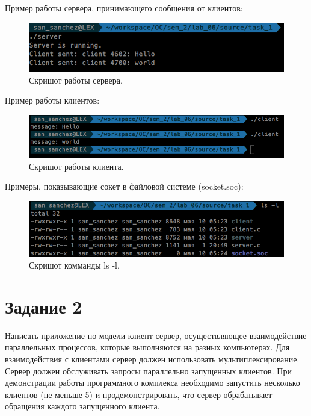 Пример работы сервера, принимающего сообщения от клиентов:
\begin{figure}[H]
    \centering
    \includegraphics[scale=0.6]{data/image/cor_2.png}
    \caption{Скришот работы сервера.}
\end{figure}
Пример работы клиентов:
\begin{figure}[H]
    \centering
    \includegraphics[scale=0.6]{data/image/cor_3.png}
    \caption{Скришот работы клиента.}
\end{figure}

Примеры, показывающие сокет в файловой системе (socket.soc):
\begin{figure}[H]
    \centering
    \includegraphics[scale=0.38]{data/image/cor_1.png}
    \caption{Скришот комманды ls -l.}
\end{figure}


\section{Задание \No{}2}

Написать приложение по модели клиент-сервер, осуществляющее взаимодействие параллельных процессов, которые выполняются на разных компьютерах. Для взаимодействия с клиентами сервер должен использовать мультиплексирование. Сервер должен обслуживать запросы параллельно запущенных клиентов. При демонстрации работы программного комплекса необходимо запустить несколько клиентов (не меньше 5) и продемонстрировать, что сервер обрабатывает обращения каждого запущенного клиента.

